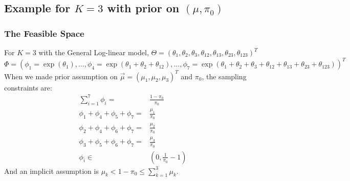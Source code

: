 \documentclass[11 pt, a4paper]{article}  %
\begin{document}

\newpage
\subsection{Example for $K=3$ with prior on $(\mu, \pi_0)$}
\subsubsection{The Feasible Space}
For $K=3$ with the General Log-linear model,
$\Theta = (\theta_1, \theta_2, \theta_3, \theta_{12}, \theta_{13}, \theta_{23}, \theta_{123})^T$\\
$\Phi = (\phi_1 = \exp{(\theta_1)}, \ldots, \phi_4 = \exp{(\theta_1 + \theta_2 + \theta_{12})}, \ldots, 
\phi_7 = \exp{(\theta_1 + \theta_2 + \theta_3 + \theta_{12} + \theta_{13} + \theta_{23} + \theta_{123})} )^T$
When we made prior assumption on $\vec{\mu} = (\mu_1, \mu_2, \mu_3)^T$ and $\pi_0$, the sampling constraints are:
\begin{align*}
\sum_{i=1}^7 \phi_i = & \frac{1-\pi_0}{\pi_0}\\
\phi_1 + \phi_4 + \phi_5 + \phi_7 = & \frac{\mu_1}{\pi_0}\\
\phi_2 + \phi_4 + \phi_6 + \phi_7 = & \frac{\mu_2}{\pi_0}\\
\phi_3 + \phi_5 + \phi_6 + \phi_7 = & \frac{\mu_3}{\pi_0}\\
\phi_i \in & (0, \frac{1}{\pi_0}-1)
\end{align*}
And an implicit assumption is $\mu_k < 1 - \pi_0 \leq \sum_{k=1}^3 \mu_k$.\\
\end{document}
